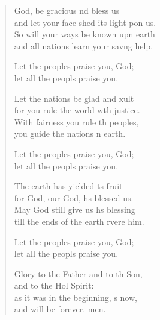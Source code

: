 \settowidth{\versewidth}{and let your face shed its light upon us.}
\begin{verse}%
  \begin{patverse}
 God, be gracious nd bless us\Med\\
and let your face shed its light pon us.\\
So will your ways be known upn earth\Med\\
and all nations learn your sav\pointup{\i}ng help.

Let the peoples praise you,  God;\Med\\
let all the peopls praise you.

Let the nations be glad and xult\Med\\
for you rule the world w\pointup{\i}th justice.\\
With fairness you rule th peoples,\Med\\
you guide the nations n earth.

Let the peoples praise you,  God;\Med\\
let all the peopls praise you.

The earth has yielded \pointup{\i}ts fruit\Med\\
for God, our God, hs blessed us.\\
May God still give us h\pointup{\i}s blessing\Med\\
till the ends of the earth rvere him.

Let the peoples praise you,  God;\Med\\
let all the peopls praise you.

Glory to the Father and to th Son,\Med\\
and to the Hol Spirit:\\
as it was in the beginning, \pointup{\i}s now,\Med\\
and will be forever. men.
  \end{patverse}
\end{verse}
